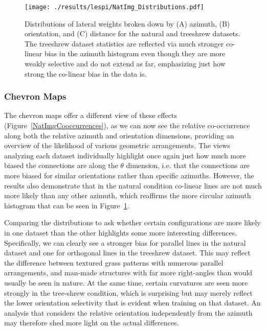\begin{figure}
	\centering
        \texttt{[image: ./results/lespi/NatImg\_Distributions.pdf]}
	\caption[Distributions of lateral weights broken down by azimuth,
      orientation, and distance.]{Distributions of lateral weights
      broken down by (A) azimuth, (B) orientation, and (C) distance
      for the natural and treeshrew datasets. The treeshrew dataset
      statistics are reflected via much stronger co-linear bias in the
      azimuth histogram even though they are more weakly selective and
      do not extend as far, emphasizing just how strong the co-linear
      bias in the data is.}
	\label{NatImgDistributions}
\end{figure}

\subsubsection*{Chevron Maps}

The chevron maps offer a different view of these effects
(Figure~\ref{NatImgCooccurrences}), as we can now see the relative
co-occurrence along both the relative azimuth and orientation
dimensions, providing an overview of the likelihood of various
geometric arrangements. The views analyzing each dataset individually
highlight once again just how much more biased the connections are
along the $\theta$ dimension, i.e. that the connections are more
biased for similar orientations rather than specific
azimuths. However, the results also demonstrate that in the natural
condition co-linear lines are not much more likely than any other
azimuth, which reaffirms the more circular azimuth histogram that can
be seen in Figure~\ref{NatImgDistributions}.

Comparing the distributions to ask whether certain configurations are
more likely in one dataset than the other highlights some more
interesting differences.  Specifically, we can clearly see a stronger
bias for parallel lines in the natural dataset and one for orthogonal
lines in the treeshrew dataset. This may reflect the difference
between textured grass patterns with numerous parallel arrangements,
and man-made structures with far more right-angles than would usually
be seen in nature. At the same time, certain curvatures are seen more
strongly in the tree-shrew condition, which is surprising but may
merely reflect the lower orientation selectivity that is evident when
training on that dataset. An analysis that considers the relative
orientation independently from the azimuth may therefore shed more
light on the actual differences.

